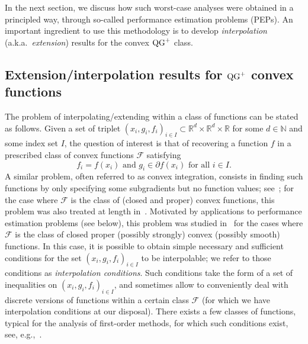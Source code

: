 In the next section, we discuss how such worst-case analyses were obtained in a principled way, through so-called performance estimation problems (PEPs). An important ingredient to use this methodology is to develop \emph{interpolation} (a.k.a.~\emph{extension}) results for the  convex $\operatorname{QG}^+$ class.        
     
\subsection{\texorpdfstring{Extension/interpolation results for $\operatorname{QG}^+$ convex functions}{Extension-interpolation results for QG+ convex functions}}
\label{subsec:Interpol}
The problem of interpolating/extending within a class of functions can be stated as follows. Given a set of triplet $(x_i, g_i, f_i)_{i \in I}\subset \mathbb{R}^d\times\mathbb{R}^d\times \mathbb{R}$ for some $d\in\mathbb{N}$ and some index set $I$, the question of interest is that of recovering a function $f$ in a prescribed class of convex functions $\mathcal{F}$ satisfying
\[ f_i=f(x_i) \text{ and } g_i\in\partial f(x_i) \text{ for all } i\in I.\]
A similar problem, often referred to as convex integration, consists in finding such functions by only specifying some subgradients but no function values; see~\citep{Rock70}; for the case where $\mathcal{F}$ is the class of (closed and proper) convex functions, this problem was also treated at length in~\citep{lambert2004finite}. Motivated by applications to performance estimation problems (see below), this problem was studied in~\citep{taylor2017smooth} for the cases where $\mathcal{F}$ is the class of closed proper (possibly strongly) convex (possibly smooth) functions. In this case, it is possible to obtain simple necessary and sufficient conditions for the set $(x_i, g_i, f_i)_{i \in I}$ to be interpolable; we refer to those conditions as \emph{interpolation conditions}. Such conditions take the form of a set of inequalities on $(x_i, g_i, f_i)_{i \in I}$, and sometimes allow to conveniently deal with discrete versions of functions within a certain class $\mathcal{F}$ (for which we have interpolation conditions at our disposal). There exists a few classes of functions, typical for the analysis of first-order methods, for which such conditions exist, see, e.g.,~\citep[Theorem 3.3--3.6, Theorem 3.10]{taylor2017exact}.

